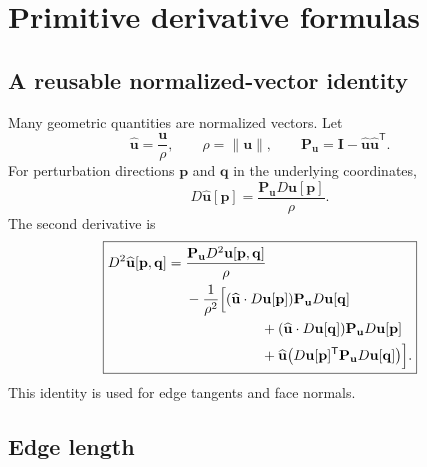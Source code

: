 \documentclass[11pt]{article}
\newcommand{\T}{\mathsf{T}}
\newcommand{\Id}{\mathbf{I}}
\newcommand{\Pmat}{\mathbf{P}}
\begin{document}
\section{Primitive derivative formulas}

\subsection{A reusable normalized-vector identity}

Many geometric quantities are normalized vectors.  Let
\begin{equation}
  \widehat{\mathbf{u}}=\frac{\mathbf{u}}{\rho},
  \qquad
  \rho=\|\mathbf{u}\|,
  \qquad
  \Pmat_{\mathbf{u}}=\Id-\widehat{\mathbf{u}}\widehat{\mathbf{u}}^\T.
\end{equation}
For perturbation directions $\mathbf{p}$ and $\mathbf{q}$ in the underlying coordinates,
\begin{equation}
  \boxed{
  D\widehat{\mathbf{u}}[\mathbf{p}]
  =\frac{\Pmat_{\mathbf{u}}D\mathbf{u}[\mathbf{p}]}{\rho}.}
  \label{eq:normalized-first}
\end{equation}
The second derivative is
\begin{equation}
  \boxed{\begin{aligned}
  D^2\widehat{\mathbf{u}}[\mathbf{p},\mathbf{q}]
  ={}&\frac{\Pmat_{\mathbf{u}}D^2\mathbf{u}[\mathbf{p},\mathbf{q}]}{\rho}
  \\
  &-\frac{1}{\rho^2}\Bigl[
    (\widehat{\mathbf{u}}\cdot D\mathbf{u}[\mathbf{p}])
      \Pmat_{\mathbf{u}}D\mathbf{u}[\mathbf{q}]
  \\
  &\hspace{19mm}+
    (\widehat{\mathbf{u}}\cdot D\mathbf{u}[\mathbf{q}])
      \Pmat_{\mathbf{u}}D\mathbf{u}[\mathbf{p}]
  \\
  &\hspace{19mm}+
    \widehat{\mathbf{u}}
      \bigl(D\mathbf{u}[\mathbf{p}]^\T
      \Pmat_{\mathbf{u}}D\mathbf{u}[\mathbf{q}]\bigr)
  \Bigr].
  \end{aligned}}
  \label{eq:normalized-second}
\end{equation}
This identity is used for edge tangents and face normals.

\subsection{Edge length}
\end{document}
